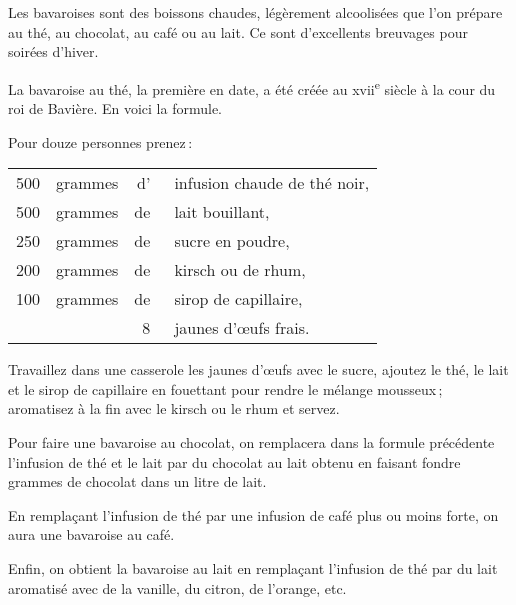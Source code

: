 Les bavaroises sont des boissons chaudes, légèrement alcoolisées que l'on
prépare au thé, au chocolat, au café ou au lait. Ce sont d'excellents breuvages
pour soirées d'hiver.

La bavaroise au thé, la première en date, a été créée au
{\sc xvii}\textsuperscript{e} siècle à la cour du roi de Bavière. En voici la
formule.

\medskip

Pour douze personnes prenez :

\footnotesize
\begin{longtable}{rrrp{16em}}
    500 & grammes & d' & infusion chaude de thé noir,                                                     \\
    500 & grammes & de & lait bouillant,                                                                  \\
    250 & grammes & de & sucre en poudre,                                                                 \\
    200 & grammes & de & kirsch ou de rhum,                                                               \\
    100 & grammes & de & sirop de capillaire,                                                             \\
        &         &  8 & jaunes d'œufs frais.                                                             \\
\end{longtable}
\normalsize

Travaillez dans une casserole les jaunes d'œufs avec le sucre, ajoutez le thé,
le lait et le sirop de capillaire en fouettant pour rendre le mélange
mousseux ; aromatisez à la fin avec le kirsch ou le rhum et servez.

\sk

Pour faire une bavaroise au chocolat, on remplacera dans la formule précédente
l'infusion de thé et le lait par du chocolat au lait obtenu en faisant fondre
{\mmm} grammes de chocolat dans un litre de lait.

\sk

En remplaçant l'infusion de thé par une infusion de café plus ou moins forte,
on aura une bavaroise au café.

\sk

Enfin, on obtient la bavaroise au lait en remplaçant l'infusion de thé par du
lait aromatisé avec de la vanille, du citron, de l'orange, etc.

